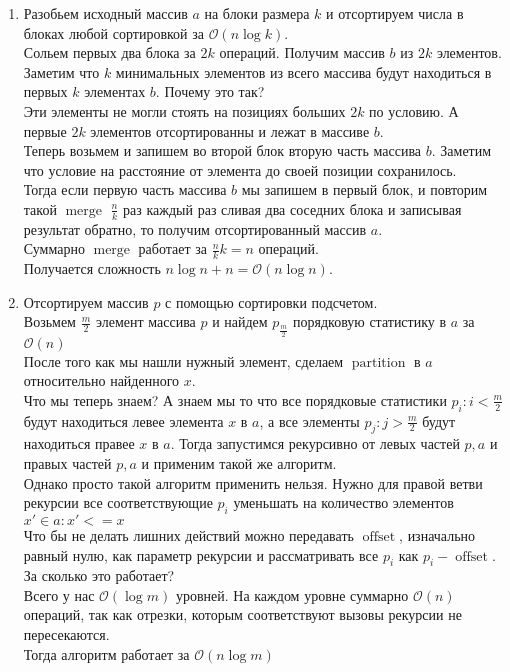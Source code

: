 \documentclass[a4paper, 10pt]{article}
\begin{document}
\begin{enumerate}
    \item{
        Разобьем исходный массив $a$ на блоки размера $k$ и отсортируем числа в блоках любой сортировкой за $\mathcal{O}(n\log{k})$.\\
        Сольем первых два блока за $2k$ операций. Получим массив $b$ из $2k$ элементов.\\
        Заметим что $k$ минимальных элементов из всего массива будут находиться в первых $k$ элементах $b$. Почему это так?\\
        Эти элементы не могли стоять на позициях больших $2k$ по условию. А первые $2k$ элементов отсортированны и лежат в массиве $b$.\\
        Теперь возьмем и запишем во второй блок вторую часть массива $b$. Заметим что условие на расстояние от элемента до своей позиции сохранилось.\\
        Тогда если первую часть массива $b$ мы запишем в первый блок, и повторим такой $\operatorname{merge}$ $\frac{n}{k}$ раз каждый раз сливая два соседних блока и записывая результат обратно, то получим отсортированный массив $a$.\\
        Суммарно $\operatorname{merge}$ работает за $\frac{n}{k}k = n$ операций.\\
        Получается сложность $n\log{n} + n = \mathcal{O}(n\log{n})$.
    }

    \item{
        Отсортируем массив $p$ с помощью сортировки подсчетом.\\
        Возьмем $\frac{m}{2}$ элемент массива $p$ и найдем $p_{\frac{m}{2}}$ порядковую статистику в $a$ за $\mathcal{O}(n)$\\
        После того как мы нашли нужный элемент, сделаем $\operatorname{partition}$ в $a$ относительно найденного $x$.\\
        Что мы теперь знаем? А знаем мы то что все порядковые статистики $p_i: i < \frac{m}{2}$ будут находиться левее элемента $x$ в $a$, а все элементы $p_j: j > \frac{m}{2}$ будут находиться правее $x$ в $a$.
        Тогда запустимся рекурсивно от левых частей $p, a$ и правых частей $p, a$ и применим такой же алгоритм.\\
        Однако просто такой алгоритм применить нельзя. Нужно для правой ветви рекурсии все соответствующие $p_i$ уменьшать на количество элементов $x' \in a: x' <= x$\\
        Что бы не делать лишних действий можно передавать $\operatorname{offset}$, изначально равный нулю, как параметр рекурсии и рассматривать все $p_i$ как $p_i - \operatorname{offset}$.\\
        За сколько это работает?\\
        Всего у нас $\mathcal{O}(\log{m})$ уровней. На каждом уровне суммарно $\mathcal{O}(n)$ операций, так как отрезки, которым соответствуют вызовы рекурсии не пересекаются.\\
        Тогда алгоритм работает за $\mathcal{O}(n\log{m})$
    }


\end{enumerate}
\end{document}

